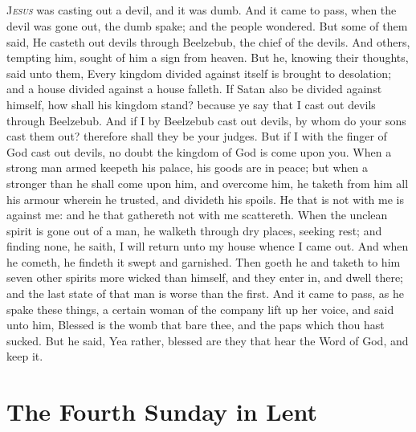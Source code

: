 \subsection{}
\lettrine{J}{\emph{esus}} was casting out a devil, and it was dumb. And it came to pass, when the devil was gone out, the dumb spake; and the people wondered. But some of them said, He casteth out devils through Beelzebub, the chief of the devils. And others, tempting him, sought of him a sign from heaven. But he, knowing their thoughts, said unto them, Every kingdom divided against itself is brought to desolation; and a house divided against a house falleth. If Satan also be divided against himself, how shall his kingdom stand? because ye say that I cast out devils through Beelzebub. And if I by Beelzebub cast out devils, by whom do your sons cast them out? therefore shall they be your judges. But if I with the finger of God cast out devils, no doubt the kingdom of God is come upon you. When a strong man armed keepeth his palace, his goods are in peace; but when a stronger than he shall come upon him, and overcome him, he taketh from him all his armour wherein he trusted, and divideth his spoils. He that is not with me is against me: and he that gathereth not with me scattereth. When the unclean spirit is gone out of a man, he walketh through dry places, seeking rest; and finding none, he saith, I will return unto my house whence I came out. And when he cometh, he findeth it swept and garnished. Then goeth he and taketh to him seven other spirits more wicked than himself, and they enter in, and dwell there; and the last state of that man is worse than the first. And it came to pass, as he spake these things, a certain woman of the company lift up her voice, and said unto him, Blessed is the womb that bare thee, and the paps which thou hast sucked. But he said, Yea rather, blessed are they that hear the Word of God, and keep it.

\section{The Fourth Sunday in Lent}%
\subsection{}

